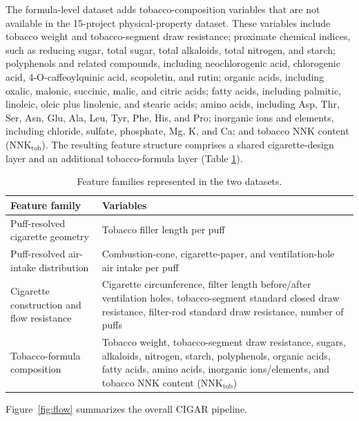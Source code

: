 ﻿\documentclass[a4paper,fleqn]{cas-sc}
\begin{document}
The formula-level dataset adds tobacco-composition variables that are not available in the 15-project physical-property dataset. These variables include tobacco weight and tobacco-segment draw resistance; proximate chemical indices, such as reducing sugar, total sugar, total alkaloids, total nitrogen, and starch; polyphenols and related compounds, including neochlorogenic acid, chlorogenic acid, 4-O-caffeoylquinic acid, scopoletin, and rutin; organic acids, including oxalic, malonic, succinic, malic, and citric acids; fatty acids, including palmitic, linoleic, oleic plus linolenic, and stearic acids; amino acids, including Asp, Thr, Ser, Asn, Glu, Ala, Leu, Tyr, Phe, His, and Pro; inorganic ions and elements, including chloride, sulfate, phosphate, Mg, K, and Ca; and tobacco NNK content ($\mathrm{NNK}_{\mathrm{tob}}$). The resulting feature structure comprises a shared cigarette-design layer and an additional tobacco-formula layer (Table \ref{tab:feature_dimensions}).

\begin{table}[pos=h]
    \centering
    \caption{Feature families represented in the two datasets.}
    \label{tab:feature_dimensions}
    \begin{tabular}{p{} p{}}
        \toprule
        Feature family & Variables \\
        \midrule
        Puff-resolved cigarette geometry & Tobacco filler length per puff \\
        Puff-resolved air-intake distribution & Combustion-cone, cigarette-paper, and ventilation-hole air intake per puff \\
        Cigarette construction and flow resistance & Cigarette circumference, filter length before/after ventilation holes, tobacco-segment standard closed draw resistance, filter-rod standard draw resistance, number of puffs \\
        Tobacco-formula composition & Tobacco weight, tobacco-segment draw resistance, sugars, alkaloids, nitrogen, starch, polyphenols, organic acids, fatty acids, amino acids, inorganic ions/elements, and tobacco NNK content ($\mathrm{NNK}_{\mathrm{tob}}$) \\
        \bottomrule
    \end{tabular}
\end{table}

Figure~\ref{fig:flow} summarizes the overall CIGAR pipeline.
\end{document}
